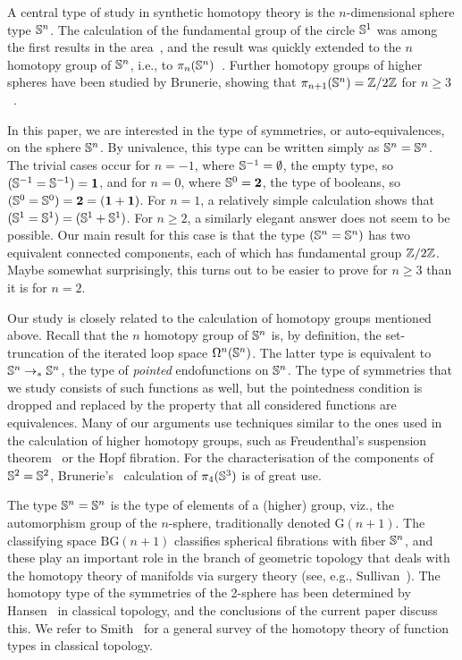 \documentclass[english,a4paper]{lmcs}
\begin{document}
A central type of study in synthetic homotopy theory is the $n$-dimensional sphere type ${\mathbb S^{n}}$.
The calculation of the fundamental group of the circle ${\mathbb S^{1}}$ was among the first results in the area~\cite{licataShulman_circle}, and the result was quickly extended to the $n$\th{} homotopy group of ${\mathbb S^{n}}$, i.e., to $\pi_n({\mathbb S^{n}})$~\cite{licataBrunerie_s1again}.
Further homotopy groups of higher spheres have been studied by Brunerie, showing that $\pi_{n+1}({\mathbb S^{n}}) = \mathbb{Z}/2 \mathbb{Z}$ for $n \geq 3$~\cite{brunerie:thesis}.

In this paper, we are interested in the type of symmetries, or auto-equivalences, on the sphere ${\mathbb S^{n}}$.
By univalence, this type can be written simply as ${\mathbb S^{n}} = {\mathbb S^{n}}$.
The trivial cases occur for $n = -1$,
where ${\mathbb S^{-1}}=\emptyset$, the empty type, so $({\mathbb S^{-1}} = {\mathbb S^{-1}}) = \mathbf{1}$,
and for $n= 0$,
where ${\mathbb S^{0}}=\mathbf{2}$, the type of booleans, so $({\mathbb S^{0}} = {\mathbb S^{0}}) = \mathbf{2} = (\mathbf{1}+\mathbf{1})$.
For $n = 1$, a relatively simple calculation shows that $({\mathbb S^{1}} = {\mathbb S^{1}}) = ({\mathbb S^{1}} + {\mathbb S^{1}})$.
For $n \geq 2$, a similarly elegant answer does not seem to be possible.
Our main result for this case is that the type $({\mathbb S^{n}} = {\mathbb S^{n}})$ has two equivalent connected components, each of which has fundamental group $\mathbb{Z} / 2 \mathbb{Z}$.
Maybe somewhat surprisingly, this turns out to be easier to prove for $n \geq 3$ than it is for $n = 2$.

Our study is closely related to the calculation of homotopy groups mentioned above.
Recall that the $n$\th{} homotopy group of ${\mathbb S^{n}}$ is, by definition, the set-truncation of the iterated loop space $\Omega^n({\mathbb S^{n}})$.
The latter type is equivalent to ${\mathbb S^{n}} \to_\ast {\mathbb S^{n}}$, the type of \emph{pointed} endofunctions on ${\mathbb S^{n}}$.
The type of symmetries that we study consists of such functions as well, but the pointedness condition is dropped and replaced by the property that all considered functions are equivalences.
Many of our arguments use techniques similar to the ones used in the calculation of higher homotopy groups, such as Freudenthal's suspension theorem~\cite[Thm 8.6.4]{HoTT} or the Hopf fibration.
For the characterisation of the components of ${\mathbb S^{2}} = {\mathbb S^{2}}$, Brunerie's~\cite{brunerie:thesis} calculation of $\pi_4({\mathbb S^{3}})$ is of great use.

The type ${\mathbb S^{n}} = {\mathbb S^{n}}$ is the type of elements of a (higher) group, viz., the automorphism
group of the $n$-sphere, traditionally denoted $\mathrm{G}(n+1)$.
The classifying space $\mathrm{BG}(n+1)$ classifies spherical fibrations with fiber ${\mathbb S^{n}}$,
and these play an important role in the branch of geometric topology that deals with the homotopy theory of manifolds via surgery theory (see, e.g., Sullivan~\cite{sullivan1970}).
The homotopy type of the symmetries of the 2-sphere has been determined by Hansen~\cite{hansen} in classical topology, and the conclusions of the current paper discuss this.
We refer to Smith~\cite{smith2010} for a general survey of the homotopy theory of function types in classical topology.
\end{document}
